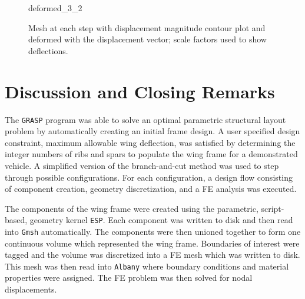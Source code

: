 \documentclass[conf]{new-aiaa}
\begin{document}
\begin{figure}[H]
{      {deformed_3_2}
    }
  \caption{
        Mesh at each step with displacement magnitude contour plot and
        deformed with the displacement vector;
        scale factors used to show deflections.}
  \label{fig:all_solutions}
\end{figure}

\section{Discussion and Closing Remarks} \label{sec:closing_remarks}
The \texttt{GRASP} program was able to solve
an optimal parametric structural layout problem by
automatically creating an initial frame design.
A user specified design constraint, maximum allowable wing deflection, 
was satisfied by determining the integer numbers of ribs and spars
to populate the wing frame for a demonstrated vehicle.
A simplified version of the branch-and-cut method was used
to step through possible configurations.
For each configuration, a design flow consisting of
component creation, geometry discretization, and a FE analysis
was executed.

The components of the wing frame were created 
using the parametric, script-based, geometry kernel \texttt{ESP}.
Each component was written to disk and 
then read into \texttt{Gmsh} automatically.
The components were then unioned together to form one
continuous volume which represented the wing frame.
Boundaries of interest were tagged and the 
volume was discretized into a FE mesh which was written to disk.
This mesh was then read into \texttt{Albany}
where boundary conditions and material properties 
were assigned.
The FE problem was then solved for nodal displacements.
\end{document}
